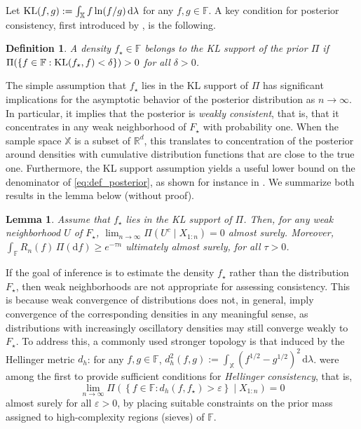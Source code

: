 \documentclass[11pt,twoside]{article}
\newcommand{\kl}{\textnormal{KL}}
\newtheorem{lemma}{Lemma}
\newtheorem{definition}{Definition}
\def\RR{\mathbb{R}}
\def\FF{\mathbb{F}}
\def\XX{\mathbb{X}}
\def\FF{\mathbb{F}}
\begin{document}
Let $\kl(f, g):= \int_\XX f\ln(f/g)\,\mathrm d\lambda$ for any $f, g \in \FF$. A key condition for posterior consistency, first introduced by \cite{schwartz1964consistency}, is the following.

\begin{definition}\label{def:KL_support}
    A density $f_\star \in \FF$ belongs to the KL support of the prior $\Pi$ if $\Pi(\left\{f \in \FF : \kl(f_\star, f) < \delta\right\}) > 0$  for all $\delta > 0$.
\end{definition}

The simple assumption that $f_\star$ lies in the KL support of $\Pi$ has significant implications for the asymptotic behavior of the posterior distribution as $n \to \infty$. In particular, it implies that the posterior is \emph{weakly consistent}, that is, that it concentrates in any weak neighborhood of $F_\star$ with probability one. When the sample space $\XX$ is a subset of $\RR^d$, this translates to concentration of the posterior around densities with cumulative distribution functions that are close to the true one. Furthermore, the KL support assumption yields a useful lower bound on the denominator of \eqref{eq:def_posterior}, as shown for instance in \cite[lemma 4]{barron1999consistency}. We summarize both results in the lemma below (without proof).

\begin{lemma}\label{lem:schwartz}
    Assume that $f_\star$ lies in the KL support of $\Pi$. Then, for any weak neighborhood $U$ of $F_\star$, $\lim_{n\to\infty} \Pi(U^c \mid X_{1:n}) = 0$ almost surely. Moreover, $\int_\FF R_n(f)\,\Pi(\mathrm df) \geq e^{-\tau n}$ ultimately almost surely, for all $\tau > 0$.
\end{lemma}

If the goal of inference is to estimate the density $f_\star$ rather than the distribution $F_\star$, then weak neighborhoods are not appropriate for assessing consistency. This is because weak convergence of distributions does not, in general, imply convergence of the corresponding densities in any meaningful sense, as distributions with increasingly oscillatory densities may still converge weakly to $F_\star$. To address this, a commonly used stronger topology is that induced by the Hellinger metric $d_h$:  for any $f, g \in \FF$, $d_h^2(f,g) := \int_\XX (f^{1/2} - g^{1/2})^2\, \mathrm d\lambda$. \cite{barron1999consistency, ghosal1999posterior, walker2004newapproaches} were among the first to provide sufficient conditions for \emph{Hellinger consistency}, that is,
%
\begin{equation*}
    \lim_{n\to\infty} \Pi\left(\left\{f \in \FF : d_h(f, f_\star) > \varepsilon \right\} \mid X_{1:n} \right) = 0
\end{equation*}
%
almost surely for all $\varepsilon > 0$, by placing suitable constraints on the prior mass assigned to high-complexity regions (sieves) of $\FF$.
 
\end{document}
